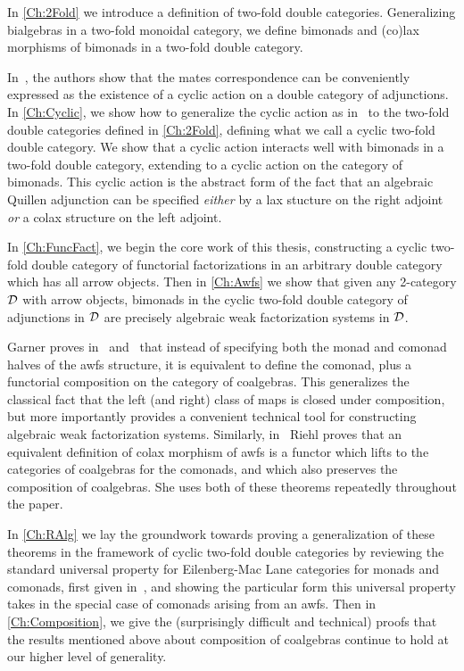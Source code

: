 In \cref{Ch:2Fold} we introduce a definition of two-fold double categories. Generalizing bialgebras in a two-fold monoidal category, we define bimonads and (co)lax morphisms of bimonads in a two-fold double category.

In~\cite{cgr:mates}, the authors show that the mates correspondence can be conveniently expressed as the existence of a cyclic action on a double category of adjunctions. In \cref{Ch:Cyclic}, we show how to generalize the cyclic action as in~\cite{cgr:mates} to the two-fold double categories defined in \cref{Ch:2Fold}, defining what we call a cyclic two-fold double category. We show that a cyclic action interacts well with bimonads in a two-fold double category, extending to a cyclic action on the category of bimonads. This cyclic action is the abstract form of the fact that an algebraic Quillen adjunction can be specified \emph{either} by a lax stucture on the right adjoint \emph{or} a colax structure on the left adjoint.

In \cref{Ch:FuncFact}, we begin the core work of this thesis, constructing a cyclic two-fold double category of functorial factorizations in an arbitrary double category which has all arrow objects. Then in \cref{Ch:Awfs} we show that given any 2-category $\mathcal{D}$ with arrow objects, bimonads in the cyclic two-fold double category of adjunctions in $\mathcal{D}$ are precisely algebraic weak factorization systems in $\mathcal{D}$.

Garner proves in~\cite{garner:nwfs} and~\cite{garner:soa} that instead of specifying both the monad and comonad halves of the awfs structure, it is equivalent to define the comonad, plus a functorial composition on the category of coalgebras. This generalizes the classical fact that the left (and right) class of maps is closed under composition, but more importantly provides a convenient technical tool for constructing algebraic weak factorization systems. Similarly, in~\cite{riehl:nwfs-model} Riehl proves that an equivalent definition of colax morphism of awfs is a functor which lifts to the categories of coalgebras for the comonads, and which also preserves the composition of coalgebras. She uses both of these theorems repeatedly throughout the paper.

In \cref{Ch:RAlg} we lay the groundwork towards proving a generalization of these theorems in the framework of cyclic two-fold double categories by reviewing the standard universal property for Eilenberg-Mac Lane categories for monads and comonads, first given in~\cite{street:ftm}, and showing the particular form this universal property takes in the special case of comonads arising from an awfs. Then in \cref{Ch:Composition}, we give the (surprisingly difficult and technical) proofs that the results mentioned above about composition of coalgebras continue to hold at our higher level of generality.

